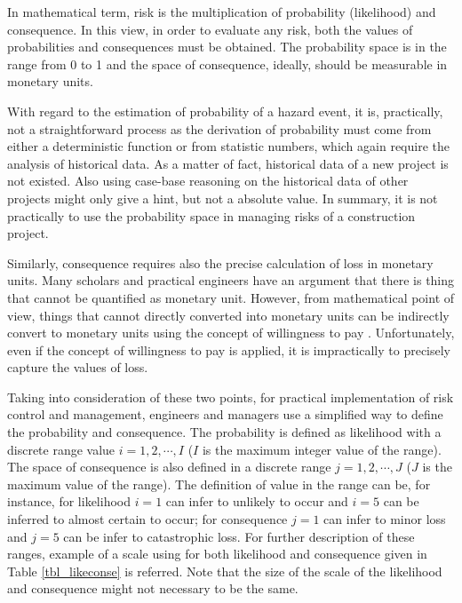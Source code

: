 \documentclass[10pt,halfline,a4paper]{ouparticle}
\begin{document}
In mathematical term, risk is the multiplication of probability (likelihood) and consequence. In this view, in order to evaluate any risk, both the values of probabilities and consequences must be obtained. The probability space is in the range from 0 to 1 and the space of consequence, ideally, should be measurable in monetary units. 

With regard to the estimation of probability of a hazard event, it is, practically, not a straightforward process as the derivation of probability must come from either a deterministic function or from statistic numbers, which again require the analysis of historical data. As a matter of fact, historical data of a new project is not existed. Also using case-base reasoning on the historical data of other projects might only give a hint, but not a absolute value. In summary, it is not practically to use the probability space in managing risks of a construction project. 

Similarly, consequence requires also the precise calculation of loss in monetary units. Many scholars and practical engineers have an argument that there is thing that cannot be quantified as monetary unit. However, from mathematical point of view, things that cannot directly converted into monetary units can be indirectly  convert to monetary units using the concept of willingness to pay \citep{Breidert2006,Adey2012}. Unfortunately, even if the concept of willingness to pay is applied, it is impractically to precisely capture the values of loss. 

Taking into consideration of these two points, for practical implementation of risk control and management, engineers and managers use a simplified way to define the probability and consequence. The probability is defined as likelihood with a discrete range value $i=1,2,\cdots, I$ ($I$ is the maximum integer value of the range). The space of consequence is also defined in a discrete range $j=1,2,\cdots,J$ ($J$ is the maximum value of the range). The definition of value in the range can be, for instance, for likelihood $i=1$ can infer to unlikely to occur and $i=5$ can be inferred to almost certain to occur; for consequence $j=1$ can infer to minor loss and $j=5$ can be infer to catastrophic loss. For further description of these ranges, example of a scale using for both likelihood and consequence given in Table \ref{tbl_likeconse} is referred. Note that the size of the scale of the likelihood and consequence might not necessary to be the same. 
\end{document}
